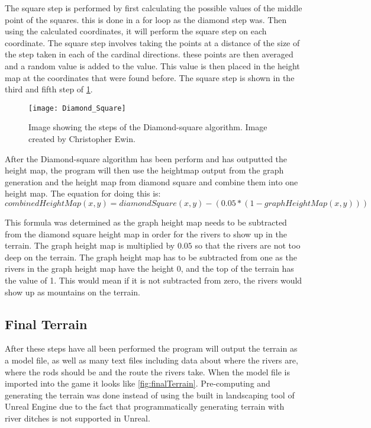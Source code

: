 
	The square step is performed by first calculating the possible values of the middle point of the squares. this is done in a for loop as the diamond step was. Then using the calculated coordinates, it will perform the square step on each coordinate. The square step involves taking the points at a distance of the size of the step taken in each of the cardinal directions. these points are then averaged and a random value is added to the value. This value is then placed in the height map at the coordinates that were found before. The square step is shown in the third and fifth step of \ref{fig:DiamondSquare}.

\begin{figure}[H]
	\texttt{[image: Diamond\_Square]}
	\centering
	\caption{Image showing the steps of the Diamond-square algorithm. Image created by Christopher Ewin\cite{diamondsquare}.}
	\label{fig:DiamondSquare}
\end{figure}

	After the Diamond-square algorithm has been perform and has outputted the height map, the program will then use the heightmap output from the graph generation and the height map from diamond square and combine them into one height map. The equation for doing this is:\\

	$$combinedHeightMap(x, y) =  diamondSquare(x, y) - (0.05 * (1 - graphHeightMap(x, y)))$$

	This formula was determined as the graph height map needs to be subtracted from the diamond square height map in order for the rivers to show up in the terrain. The graph height map is multiplied by $0.05$ so that the rivers are not too deep on the terrain. The graph height map has to be subtracted from one as the rivers in the graph height map have the height 0, and the top of the terrain has the value of 1. This would mean if it is not subtracted from zero, the rivers would show up as mountains on the terrain.\\

\subsection{Final Terrain}
	After these steps have all been performed the program will output the terrain as a model file, as well as many text files including data about where the rivers are, where the rods should be and the route the rivers take. When the model file is imported into the game it looks like \ref{fig:finalTerrain}. Pre-computing and generating the terrain was done instead of using the built in landscaping tool of Unreal Engine due to the fact that programmatically generating terrain with river ditches is not supported in Unreal.


